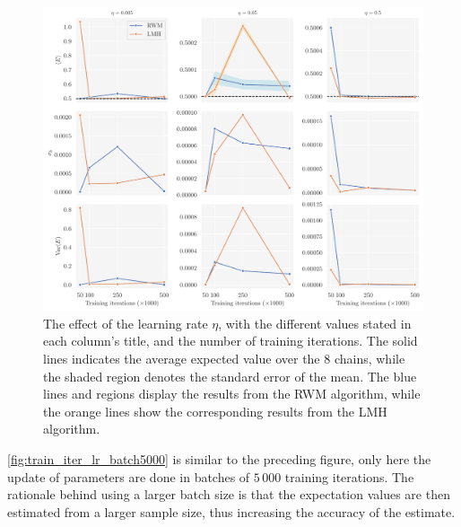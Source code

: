 \begin{figure}[!htb]
\begin{center}\includegraphics[width=\textwidth]{latex/figures/training_cycles_lr_batch1000.pdf}
\end{center}
\caption{The effect of the learning rate $\eta$, with the different values stated in each column's title, and the number of training iterations.   The solid lines indicates the average expected value over the $8$ chains, while the shaded region denotes the standard error of the mean. The blue lines and regions display the results from the RWM algorithm, while the orange lines show the corresponding results from the LMH algorithm.
}
\label{fig:train_iter_lr_batch1000}
\end{figure}

\autoref{fig:train_iter_lr_batch5000} is similar to the preceding figure, only here the update of parameters are done in batches of $5\,000$ training iterations. The rationale behind using a larger batch size is that the expectation values are then estimated from a larger sample size, thus increasing the accuracy of the estimate.

